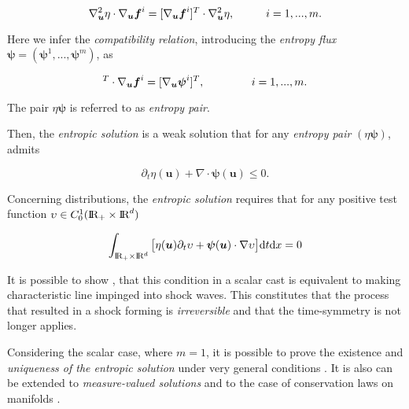 \begin{equation}
\nabla_{\boldsymbol{u}}^2\eta\cdot\nabla_{\boldsymbol{u}}\boldsymbol{f}^i = [\nabla_{\boldsymbol{u}}\boldsymbol{f}^i]^{T}\cdot\nabla_{\boldsymbol{u}}^2\eta, \hspace{10mm} i = 1, ... , m.
\end{equation}

Here we infer the \textit{compatibility relation}, introducing the \textit{entropy flux} $\boldsymbol{\psi} = (\boldsymbol{\psi}^1,...,\boldsymbol{\psi}^m)$, as 

\begin{equation}
[\nabla_{\boldsymbol{u}}\eta]^T\cdot\nabla_{\boldsymbol{u}}\boldsymbol{f}^i = [\nabla_{\boldsymbol{u}}\boldsymbol{\psi}^i]^T, \hspace{15mm} i = 1,...,m.
\end{equation}

The pair $\eta\boldsymbol{\psi}$ is referred to as \textit{entropy pair}.

Then, the \textit{entropic solution} is a weak solution that for any \textit{entropy pair} $(\eta\boldsymbol{\psi})$, admits

\begin{equation}
\partial_t\eta(\boldsymbol{u}) + \nabla\cdot\boldsymbol{\psi}(\boldsymbol{u})\leq 0.
\end{equation}

Concerning distributions, the \textit{entropic solution} requires that for any positive test function $\upsilon\in C_0 ^1 (\text{I\!R}_+\times\text{I\!R}^d)$  

\begin{equation}
\int_{\text{I\!R}_+\times\text{I\!R}^d} \big[\eta(\boldsymbol{u})\partial_t\upsilon + \boldsymbol{\psi}(\boldsymbol{u}) \cdot \nabla\upsilon \big]\text{d}t\text{d}x = 0
\end{equation}

It is possible to show \cite{LeVeque:1992}, that this condition in a scalar cast is equivalent to making characteristic line impinged into shock waves. 
This constitutes that the process that resulted in a shock forming is \textit{irreversible} and that the time-symmetry is not longer applies. 

Considering the scalar case, where $m=1$, it is possible to prove the existence and \textit{uniqueness of the entropic solution} under very general conditions \cite{Kruzkov:1970}. 
It is also can be extended to \textit{measure-valued solutions} \cite{DiPerna:1985} and to the case of conservation laws on manifolds \cite{Benartzi:2007}.

